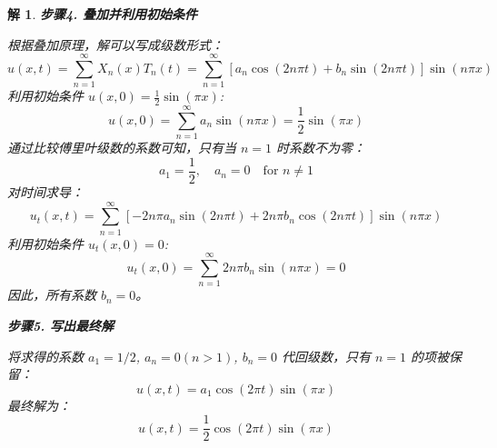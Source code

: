 \documentclass[12pt,a4paper]{article}
\newtheorem*{solution}{解}
\begin{document}
\begin{solution}
		\hrulefill
		
		\textbf{步骤4. 叠加并利用初始条件}
		
		\noindent
		根据叠加原理，解可以写成级数形式：
		\[
		u(x,t) = \sum_{n=1}^\infty X_n(x)T_n(t) = \sum_{n=1}^\infty [a_n \cos(2n\pi t) + b_n \sin(2n\pi t)] \sin(n\pi x)
		\]
		利用初始条件 $u(x,0) = \frac{1}{2}\sin(\pi x)$:
		\[
		u(x,0) = \sum_{n=1}^\infty a_n \sin(n\pi x) = \frac{1}{2}\sin(\pi x)
		\]
		通过比较傅里叶级数的系数可知，只有当 $n=1$ 时系数不为零：
		\[
		a_1 = \frac{1}{2}, \quad a_n = 0 \quad \text{for } n \neq 1
		\]
		对时间求导：
		\[
		u_t(x,t) = \sum_{n=1}^\infty [-2n\pi a_n \sin(2n\pi t) + 2n\pi b_n \cos(2n\pi t)] \sin(n\pi x)
		\]
		利用初始条件 $u_t(x,0) = 0$:
		\[
		u_t(x,0) = \sum_{n=1}^\infty 2n\pi b_n \sin(n\pi x) = 0
		\]
		因此，所有系数 $b_n=0$。
		
		\hrulefill
		
		\textbf{步骤5. 写出最终解}
		
		\noindent
		将求得的系数 $a_1=1/2$, $a_n=0 (n>1)$, $b_n=0$ 代回级数，只有 $n=1$ 的项被保留：
		\[
		u(x,t) = a_1 \cos(2\pi t) \sin(\pi x)
		\]
		最终解为：
		\[
		u(x,t) = \frac{1}{2}\cos(2\pi t)\sin(\pi x)
		\]
	\end{solution}
	
	\newpage
\end{document}
